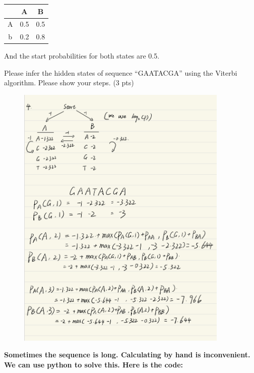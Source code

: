 \documentclass{article}
\begin{document}
\begin{tabular}{|c|c|c|}
    \hline
    &A&B\\
    \hline
    A & 0.5 &0.5\\
    \hline
    b & 0.2&0.8  \\
    \hline
\end{tabular}

\raggedright %
And the start probabilities for both states are 0.5.

Please infer the hidden states of sequence “GAATACGA” using the Viterbi algorithm. 
Please show your steps. (3 pts)



\begin{figure}[H]
    \centering
    \includegraphics[width=0.9\textwidth]{q4answer.jpeg}  %

\end{figure}

\textbf{Sometimes the sequence is long. Calculating by hand is inconvenient. We can use python to solve this.
Here is the code:
}
\end{document}
